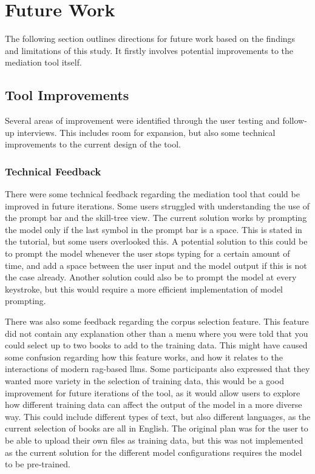\section{Future Work}
The following section outlines directions for future work based on the findings and limitations of this study. It firstly involves potential improvements to the mediation tool itself.
\subsection*{Tool Improvements}
Several areas of improvement were identified through the user testing and follow-up interviews. This includes room for expansion, but also some technical improvements to the current design of the tool.
\subsubsection*{Technical Feedback}
There were some technical feedback regarding the mediation tool that could be improved in future iterations. Some users struggled with understanding the use of the prompt bar and the skill-tree view. The current solution works by prompting the model only if the last symbol in the prompt bar is a space. This is stated in the tutorial, but some users overlooked this. A potential solution to this could be to prompt the model whenever the user stops typing for a certain amount of time, and add a space between the user input and the model output if this is not the case already. Another solution could also be to prompt the model at every keystroke, but this would require a more efficient implementation of model prompting.

There was also some feedback regarding the corpus selection feature. This feature did not contain any explanation other than a menu where you were told that you could select up to two books to add to the training data. This might have caused some confusion regarding how this feature works, and how it relates to the interactions of modern \gls{rag}-based \gls{llms}. Some participants also expressed that they wanted more variety in the selection of training data, this would be a good improvement for future iterations of the tool, as it would allow users to explore how different training data can affect the output of the model in a more diverse way. This could include different types of text, but also different languages, as the current selection of books are all in English. The original plan was for the user to be able to upload their own files as training data, but this was not implemented as the current solution for the different model configurations requires the model to be pre-trained.

